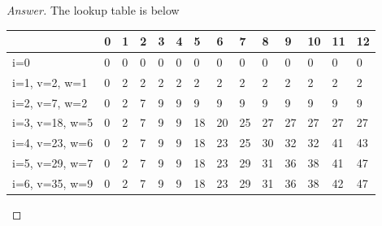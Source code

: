\documentclass[11pt]{article}
\theoremstyle{definition}
\theoremstyle{definition}
\theoremstyle{definition}
\begin{document}
\begin{proof}[Answer]

The lookup table is below \\

\centering
\begin{tabular}{|l|l|l|l|l|l|l|l|l|l|l|l|l|l|} 
\hline
\rowcolor[rgb]{0.753,0.753,0.753}                  & 0 & 1 & 2 & 3 & 4 & 5  & 6  & 7  & 8  & 9  & 10 & 11 & 12  \\ 
\hline
{\cellcolor[rgb]{0.753,0.753,0.753}}i=0            & 0 & 0 & 0 & 0 & 0 & 0  & 0  & 0  & 0  & 0  & 0  & 0  & 0   \\ 
\hline
{\cellcolor[rgb]{0.753,0.753,0.753}}i=1, v=2, w=1  & 0 & 2 & 2 & 2 & 2 & 2  & 2  & 2  & 2  & 2  & 2  & 2  & 2   \\ 
\hline
{\cellcolor[rgb]{0.753,0.753,0.753}}i=2, v=7, w=2  & 0 & 2 & 7 & 9 & 9 & 9  & 9  & 9  & 9  & 9  & 9  & 9  & 9   \\ 
\hline
{\cellcolor[rgb]{0.753,0.753,0.753}}i=3, v=18, w=5 & 0 & 2 & 7 & 9 & 9 & 18 & 20 & 25 & 27 & 27 & 27 & 27 & 27  \\ 
\hline
{\cellcolor[rgb]{0.753,0.753,0.753}}i=4, v=23, w=6 & 0 & 2 & 7 & 9 & 9 & 18 & 23 & 25 & 30 & 32 & 32 & 41 & 43  \\ 
\hline
{\cellcolor[rgb]{0.753,0.753,0.753}}i=5, v=29, w=7 & 0 & 2 & 7 & 9 & 9 & 18 & 23 & 29 & 31 & 36 & 38 & 41 & 47  \\ 
\hline
{\cellcolor[rgb]{0.753,0.753,0.753}}i=6, v=35, w=9 & 0 & 2 & 7 & 9 & 9 & 18 & 23 & 29 & 31 & 36 & 38 & 42 & 47  \\
\hline
\end{tabular}



\end{proof}
\end{document}

